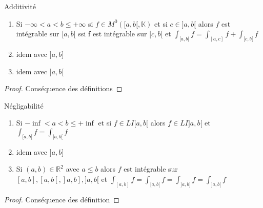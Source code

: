 \documentclass[11pt,hidelinks]{book}
\theoremstyle{mytheoremstyle}
\theoremstyle{mytheoremstyle}
\theoremstyle{mytheoremstyle}
\theoremstyle{mytheoremstyle}
\theoremstyle{mytheoremstyle}
\theoremstyle{mytheoremstyle}
\theoremstyle{mytheoremstyle}
\theoremstyle{mytheoremstyle}
\theoremstyle{myproblemstyle}
\def\mbb#1{\mathbb{#1}}
\def\bR{\mbb{R}}
\def\bK{\mbb{K}}
\def\ab{[a,b[}
\def\abc{]a,b]}
\def\abd{]a,b[}
\begin{document}
\begin{adjustwidth}{-2em}{-1em}
    \begin{prop}{Additivité}
        \begin{enumerate}
            \item Si $-\infty < a < b \leq + \infty$ si $f \in M^0(\ab, \bK)$ et si $c \in \abd$ 
            alors $f$ est intégrable sur $\ab$ ssi f est intégrable sur $[c,b[$ et $\int_{\ab} f = \int_{[a,c]} f + \int_{[c,b[} f$
            \item idem avec $\abc$
            \item idem avec $\abd$
        \end{enumerate}
        \begin{proof}
            Conséquence des définitions
        \end{proof}
    \end{prop}

    \begin{prop}{Négligabilité}
        \begin{enumerate}
        \item Si $-\inf < a < b \leq + \inf$ et si $f \in LI{[a,b[}$ alors 
        $f \in LI{\abd}$ et $\int_{\ab} f = \int_{\abd} f$
        \item idem avec $\abc$
        \item Si $(a,b) \in \bR^2$ avec $a \leq b$ alors $f$ est intégrable sur $[a,b], \ab, \abc, \abd$
        et $\int_{[a,b]} f = \int_{\ab} f = \int_{\abc} f = \int_{\abd} f$
        \end{enumerate}
        \begin{proof}
            Conséquence des définition
        \end{proof}
    \end{prop}

\end{adjustwidth}
\end{document}
